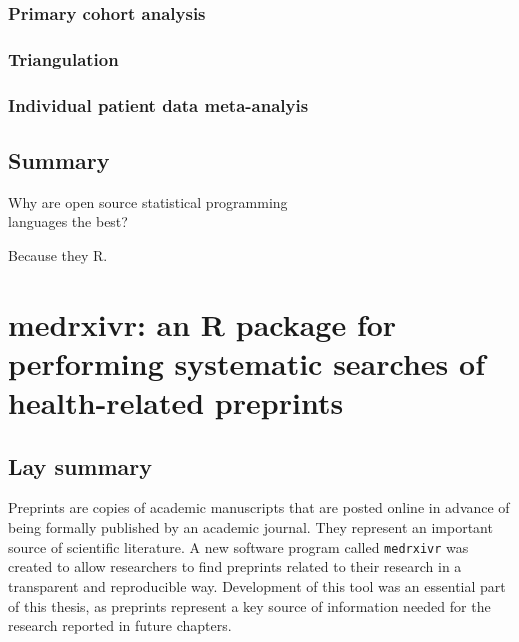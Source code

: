 \documentclass[a4paper, twoside]{templates/ociamthesis}
\begin{document}
\hypertarget{primary-cohort-analysis}{%
\subsection{Primary cohort analysis}\label{primary-cohort-analysis}}

\hypertarget{triangulation}{%
\subsection{Triangulation}\label{triangulation}}

\hypertarget{individual-patient-data-meta-analyis}{%
\subsection{Individual patient data meta-analyis}\label{individual-patient-data-meta-analyis}}

\hypertarget{summary-1}{%
\section{Summary}\label{summary-1}}

\begin{savequote}
Why are open source statistical programming\\
languages the best?

Because they R.
\end{savequote}



\hypertarget{sys-rev-tools-heading}{%
\chapter{medrxivr: an R package for performing systematic searches of health-related preprints}\label{sys-rev-tools-heading}}

\minitoc 

\hypertarget{lay-summary}{%
\section{Lay summary}\label{lay-summary}}

Preprints are copies of academic manuscripts that are posted online in advance of being formally published by an academic journal.
They represent an important source of scientific literature.
A new software program called \texttt{medrxivr} was created to allow researchers to find preprints related to their research in a transparent and reproducible way.
Development of this tool was an essential part of this thesis, as preprints represent a key source of information needed for the research reported in future chapters.
\end{document}
